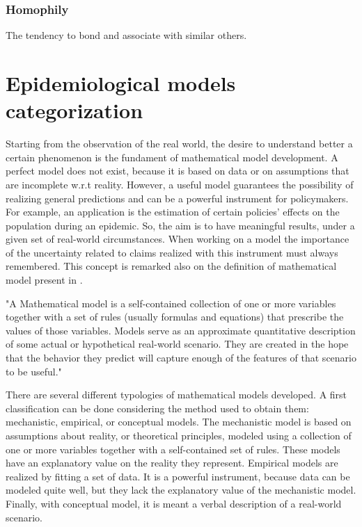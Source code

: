 \subsubsection{Homophily} The tendency to bond and associate with similar others. 

\section{Epidemiological models categorization}
Starting from the observation of the real world, the desire to understand better a certain phenomenon is the fundament of mathematical model development. A perfect model does not exist, because it is based on data or on assumptions that are incomplete w.r.t reality. However, a useful model guarantees the possibility of realizing general predictions and can be a powerful instrument for policymakers.  For example, an application is the estimation of certain policies' effects on the population during an epidemic. So, the aim is to have meaningful results, under a given set of real-world circumstances.
When working on a model the importance of the uncertainty related to claims realized with this instrument must always remembered. This concept is remarked also on the definition of mathematical model present in \cite{Ledder_2023}. 
\begin{displayquote}
	"A Mathematical model is a self-contained collection of one or more variables together with a set of rules (usually formulas and equations) that prescribe the values of those variables. Models serve as an approximate quantitative description of some actual or hypothetical real-world scenario. They are created in the hope that the behavior they predict will capture enough of the features of that scenario to be useful."
\end{displayquote}

There are several different typologies of mathematical models developed.
A first classification can be done considering the method used to obtain them: mechanistic, empirical, or conceptual models.
The mechanistic model is based on assumptions about reality, or theoretical principles, modeled using a collection of one or more variables together with a self-contained set of rules. These models have an explanatory value on the reality they represent.
Empirical models are realized by fitting a set of data. It is a powerful instrument, because data can be modeled quite well, but they lack the explanatory value of the mechanistic model.  Finally, with conceptual model, it is meant a verbal description of a real-world scenario. 

